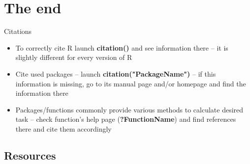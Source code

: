 \documentclass[compress, ucs, xelatex, 11pt, xcolor=svgnames,
  hyperref={
    bookmarks=true,
    unicode=true,
    colorlinks=true,
    pdftitle={Molecular data in R},
    plainpages=false,
    pdfauthor={Vojtech Zeisek},
    pdfsubject={Course about phylogeny and evolution in R},
    pdfcreator={XeLaTeX},
    pdfkeywords={R, evolution, phylogeny, molecular data},
    linkcolor=Tomato,
    anchorcolor=SaddleBrown,
    citecolor=Goldenrod,
    filecolor=DarkMagenta,
    menucolor=Sienna,
    urlcolor=DarkTurquoise,
    pdftex},
  url={hyphens, lowtilde} %
  ]{beamer}
\begin{document}
\section{The end}

\begin{frame}{Citations}
\begin{itemize}
  \item To correctly cite R launch \textbf{citation()} and see information there -- it is slightly different for every version of R
  \item Cite used packages -- launch \textbf{citation("PackageName")} -- if this information is missing, go to its manual page and/or homepage and find the information there
  \item Packages/functions commonly provide various methods to calculate desired task -- check function's help page (\textbf{\alert{?}FunctionName}) and find references there and cite them accordingly
\end{itemize}
\end{frame}

\subsection{Resources}
\end{document}
